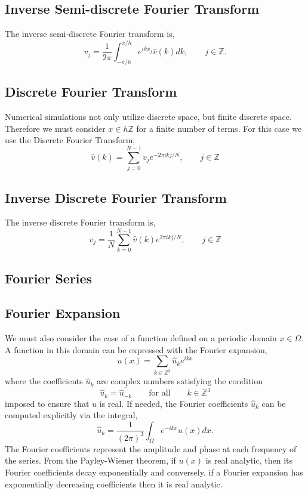 \documentclass[12pt]{article}
\begin{document}
\begin{flushleft}
\subsection{Inverse Semi-discrete Fourier Transform}
The inverse semi-discrete Fourier transform is,
$$v_j = \frac{1}{2\pi}\int_{-\pi/h}^{\pi/h}e^{ikx_j}\hat{v}(k)dk, \qquad j\in\mathbb{Z}.$$

\subsection{Discrete Fourier Transform}

\qquad Numerical simulations not only utilize discrete space, but finite discrete space. Therefore we must consider $x\in h\mathbb{Z}$ for a finite number of terms. For this case we use the Discrete Fourier Transform,
$$\hat{v}(k) = \sum_{j=0}^{N-1}v_j e^{-2\pi i k j/N}, \qquad j\in\mathbb{Z}$$

\subsection{Inverse Discrete Fourier Transform}

The inverse discrete Fourier transform is,
$$v_j = \frac{1}{N}\sum_{k=0}^{N-1} \hat{v}(k)e^{2\pi ik j/N}, \qquad j\in\mathbb{Z}$$

\subsection{Fourier Series}

\subsection{Fourier Expansion}

\qquad We must also consider the case of a function defined on a periodic domain $x\in\Omega$. A function in this domain can be expressed with the Fourier expansion,
$$u(x) = \sum_{k\in \mathbb{Z}^3}\hat{u}_k e^{ikx}$$
where the coefficients $\hat{u}_k$ are complex numbers satisfying the condition
$$\hat{u}_k = \overline{\hat{u}_{-k}} \qquad \text{for all}  \qquad k \in \mathbb{Z}^3$$
imposed to ensure that $u$ is real. If needed, the Fourier coefficients $\hat{u}_k$ can be computed explicitly via the integral,
$$\hat{u}_k = \frac{1}{(2\pi)^3}\int_{\Omega}e^{-ikx}u(x)dx.$$
The Fourier coefficients represent the amplitude and phase at each frequency of the series. From the Payley-Wiener theorem, if $u(x)$ is real analytic, then its Fourier coefficients decay exponentially and conversely, if a Fourier expansion has exponentially decreasing coefficients then it is real analytic.


\end{flushleft}
\end{document}
